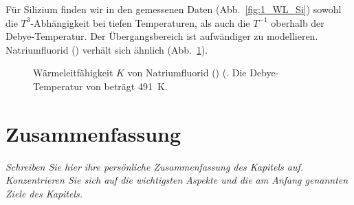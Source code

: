Für Silizium finden wir in den gemessenen Daten (Abb.~\ref{fig:1_WL_Si}) sowohl die $T^3$-Abhängigkeit bei tiefen Temperaturen, als auch die $T^{-1}$ oberhalb der Debye-Temperatur. Der Übergangsbereich ist aufwändiger zu modellieren.  Natriumfluorid () verhält sich ähnlich (Abb.~\ref{fig:1_WL_NaF}).

\begin{figure}
    \caption{Wärmeleitfähigkeit $K$  von Natriumfluorid () (\cite{Jackson1970}. Die Debye-Temperatur von  beträgt 491~K.}
    \label{fig:1_WL_NaF}
\end{figure}

\newpage

 




\section{Zusammenfassung}

\textit{Schreiben Sie hier ihre persönliche Zusammenfassung des Kapitels auf. Konzentrieren Sie sich auf die wichtigsten Aspekte und die am Anfang genannten Ziele des Kapitels.}

\vspace*{10cm}

\printbibliography[segment=\therefsegment,heading=subbibliography]
